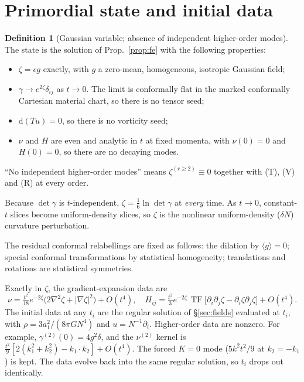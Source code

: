 \documentclass[11pt]{article}
\theoremstyle{definition}
\newtheorem{definition}[theorem]{Definition}
\theoremstyle{remark}
\newcommand{\eps}{\epsilon}
\newcommand{\dd}{\mathrm{d}}
\newcommand{\ens}[1]{\langle #1\rangle}
\newcommand{\TF}{\operatorname{TF}}
\begin{document}
\section{Primordial state and initial data}\label{sec:ic}

\begin{definition}[Gaussian variable; absence of independent higher-order modes]\label{def:ic}
The state is the solution of Prop.~\ref{prop:fe} with the following properties:
\begin{itemize}
\item[(G)] $\zeta=\eps g$ exactly, with $g$ a zero-mean, homogeneous, isotropic Gaussian field;
\item[(T)] $\gamma\to e^{2\zeta}\delta_{ij}$ as $t\to0$. The limit is conformally flat in the
  marked conformally Cartesian material chart, so there is no tensor seed;
\item[(V)] $\dd(Tu)=0$, so there is no vorticity seed;
\item[(R)] $\nu$ and $H$ are even and analytic in $t$ at fixed momenta, with $\nu(0)=0$ and
  $H(0)=0$, so there are no decaying modes.
\end{itemize}
``No independent higher-order modes'' means $\zeta^{(r\ge2)}\equiv0$ together with (T), (V) and
(R) at every order.
\end{definition}

Because $\det\gamma$ is $t$-independent, $\zeta=\frac16\ln\det\gamma$ at \emph{every} time. As
$t\to0$, constant-$t$ slices become uniform-density slices, so $\zeta$ is the nonlinear
uniform-density ($\delta N$) curvature perturbation.

The residual conformal relabellings are fixed as follows: the dilation by $\ens{g}=0$; special
conformal transformations by statistical homogeneity; translations and rotations are
statistical symmetries.

Exactly in $\zeta$, the gradient-expansion data are
\begin{equation}\label{eq:grad}
\nu=\tfrac{t^2}{18}e^{-2\zeta}\big(2\nabla^2\zeta+|\nabla\zeta|^2\big)+O(t^4),\quad
H_{ij}=\tfrac{t^2}{3}e^{-2\zeta}\,\TF\!\big[\partial_i\partial_j\zeta-\partial_i\zeta\partial_j\zeta\big]+O(t^4).
\end{equation}
The initial data at any $t_i$ are the regular solution of \S\ref{sec:fields} evaluated at
$t_i$, with $\rho=3a_1^2/(8\pi GN^4)$ and $u=N^{-1}\partial_t$. Higher-order data are nonzero.
For example, $\gamma^{(2)}(0)=4g^2\delta$, and the $\nu^{(2)}$ kernel is
$\frac{t^2}{9}[2(k_1^2+k_2^2)-k_1\cdot k_2]+O(t^4)$. The forced $K=0$ mode ($5k^2t^2/9$ at
$k_2=-k_1$) is kept. The data evolve back into the same regular solution, so $t_i$ drops out
identically.
\end{document}
